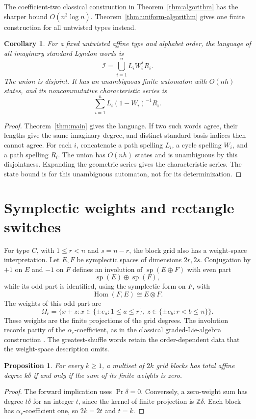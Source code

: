 \documentclass[11pt]{amsart}
\numberwithin{equation}{section}
\newtheorem{proposition}[theorem]{Proposition}
\newtheorem{corollary}[theorem]{Corollary}
\theoremstyle{definition}
\DeclareMathOperator{\Prj}{Pr}
\DeclareMathOperator{\spalg}{sp}
\newcommand{\Z}{\mathbb Z}
\begin{document}
The coefficient-two classical construction in Theorem~\ref{thm:algorithm} has the sharper bound $O(n^3\log n)$. Theorem~\ref{thm:uniform-algorithm} gives one finite construction for all untwisted types instead.

\begin{corollary}\label{cor:imaginary-language}
For a fixed untwisted affine type and alphabet order, the language of all imaginary standard Lyndon words is
\[
 \mathcal I=\bigcup_{i=1}^n L_iW_i^*R_i.
\]
The union is disjoint. It has an unambiguous finite automaton with $O(nh)$ states, and its noncommutative characteristic series is
\[
 \sum_{i=1}^n L_i(1-W_i)^{-1}R_i.
\]
\end{corollary}
\begin{proof}
Theorem~\ref{thm:main} gives the language. If two such words agree, their lengths give the same imaginary degree, and distinct standard-basis indices then cannot agree. For each $i$, concatenate a path spelling $L_i$, a cycle spelling $W_i$, and a path spelling $R_i$. The union has $O(nh)$ states and is unambiguous by this disjointness. Expanding the geometric series gives the characteristic series. The state bound is for this unambiguous automaton, not for its determinization.
\end{proof}

\section{Symplectic weights and rectangle switches}\label{sec:weights}

For type $C$, with $1\leq r<n$ and $s=n-r$, the block grid also has a weight-space interpretation. Let $E,F$ be symplectic spaces of dimensions $2r,2s$. Conjugation by $+1$ on $E$ and $-1$ on $F$ defines an involution of $\spalg(E\oplus F)$ with even part
\[
 \spalg(E)\oplus\spalg(F),
\]
while its odd part is identified, using the symplectic form on $F$, with
\[
 \operatorname{Hom}(F,E)\cong E\otimes F.
\]
The weights of this odd part are
\[
 \Omega_r=\{x+z:x\in\{\pm e_a:1\leq a\leq r\},
                       \ z\in\{\pm e_b:r<b\leq n\}\}.
\]
These weights are the finite projections of the grid degrees. The involution records parity of the $\alpha_r$-coefficient, as in the classical graded-Lie-algebra construction \cite{Vin}. The greatest-shuffle words retain the order-dependent data that the weight-space description omits.

\begin{proposition}\label{prop:zero-weight}
For every $k\geq1$, a multiset of $2k$ grid blocks has total affine degree $k\delta$ if and only if the sum of its finite weights is zero.
\end{proposition}
\begin{proof}
The forward implication uses $\Prj\delta=0$. Conversely, a zero-weight sum has degree $t\delta$ for an integer $t$, since the kernel of finite projection is $\Z\delta$. Each block has $\alpha_r$-coefficient one, so $2k=2t$ and $t=k$.
\end{proof}
\end{document}
